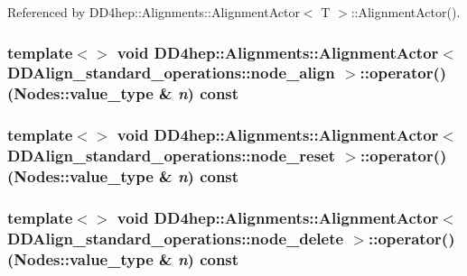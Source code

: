 Referenced by DD4hep::Alignments::AlignmentActor$<$ T $>$::AlignmentActor().\hypertarget{class_d_d4hep_1_1_alignments_1_1_alignment_actor_ad7e40f4e0ba2257f3492f5dba458682b}{
\subsubsection[{operator()}]{\setlength{\rightskip}{0pt plus 5cm}template$<$$>$ void {\bf DD4hep::Alignments::AlignmentActor}$<$ DDAlign\_\-standard\_\-operations::node\_\-align $>$::operator() (Nodes::value\_\-type \& {\em n}) const}}
\label{class_d_d4hep_1_1_alignments_1_1_alignment_actor_ad7e40f4e0ba2257f3492f5dba458682b}
\hypertarget{class_d_d4hep_1_1_alignments_1_1_alignment_actor_aa389c5c1df5d09c2a21d74b1b28aca26}{
\subsubsection[{operator()}]{\setlength{\rightskip}{0pt plus 5cm}template$<$$>$ void {\bf DD4hep::Alignments::AlignmentActor}$<$ DDAlign\_\-standard\_\-operations::node\_\-reset $>$::operator() (Nodes::value\_\-type \& {\em n}) const}}
\label{class_d_d4hep_1_1_alignments_1_1_alignment_actor_aa389c5c1df5d09c2a21d74b1b28aca26}
\hypertarget{class_d_d4hep_1_1_alignments_1_1_alignment_actor_a35e891dcac2dff5df02eb6d47aa00104}{
\subsubsection[{operator()}]{\setlength{\rightskip}{0pt plus 5cm}template$<$$>$ void {\bf DD4hep::Alignments::AlignmentActor}$<$ DDAlign\_\-standard\_\-operations::node\_\-delete $>$::operator() (Nodes::value\_\-type \& {\em n}) const}}
